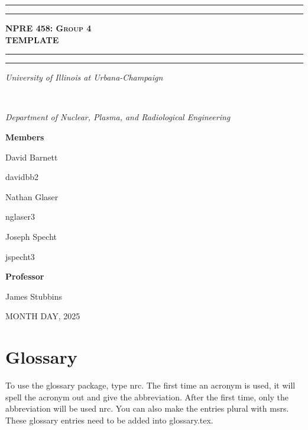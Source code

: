 \documentclass{article}
\begin{document}
\begin{titlepage}

\centering
\scshape
\vspace{\baselineskip}

\rule{\textwidth}{1.6pt}\vspace*{-\baselineskip}\vspace*{2pt}
\rule{\textwidth}{0.4pt}

{\Huge \textbf{\textsc{NPRE 458: Group 4 \\ TEMPLATE \\ \vspace{15pt}}}}

\rule{\textwidth}{0.4pt}\vspace*{-\baselineskip}\vspace{3.2pt}
\rule{\textwidth}{1.6pt}\vspace{6pt}
\centerline{\textit{University of Illinois at Urbana-Champaign}} \\
\centerline{\textit{Department of Nuclear, Plasma, and Radiological Engineering}}
\vspace{1.5\baselineskip}

\large \centerline{\textbf{Members}}

\large \centerline{David Barnett}
\small \centerline{davidbb2}

\large \centerline{Nathan Glaser}
\small \centerline{nglaser3}

\large \centerline{Joseph Specht}
\small \centerline{jspecht3}

\vspace{2\baselineskip}

\large \centerline{{\bf Professor}}
\large \centerline{James Stubbins}
\quad

\vfill
\large \centerline{MONTH DAY, 2025}
%
\end{titlepage}

\tableofcontents
\clearpage
{}

\printglossary
\clearpage

\section{Glossary}
To use the glossary package, type \gls{nrc}. The first time an acronym is used, it will spell the acronym out and give the abbreviation. After the first time, only the abbreviation will be used \gls{nrc}. You can also make the entries plural with \glspl{msr}. These glossary entries need to be added into glossary.tex.
\end{document}
